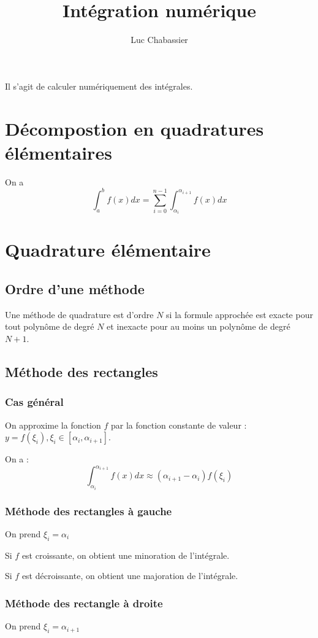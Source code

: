 \documentclass{article}
\title{Intégration numérique}
\author{Luc Chabassier}
\begin{document}
\maketitle

Il s'agit de calculer numériquement des intégrales.

\section{Décompostion en quadratures élémentaires}
On a \[\int_a^b f(x)dx = \sum_{i=0}^{n-1} \int_{\alpha_i}^{\alpha_{i+1}} f(x)dx \]

\section{Quadrature élémentaire}
\subsection{Ordre d'une méthode}
Une méthode de quadrature est d'ordre $N$ si la formule approchée est exacte pour tout polynôme de degré $N$ et inexacte pour au moins un polynôme de degré $N+1$.

\subsection{Méthode des rectangles}
\subsubsection{Cas général}
On approxime la fonction $f$ par la fonction constante de valeur : $y = f(\xi_i), \xi_i \in [\alpha_i, \alpha_{i+1}]$.

On a : \begin{equation}
    \int_{\alpha_i}^{\alpha_{i+1}} f(x)dx \approx (\alpha_{i+1} - \alpha_i)f(\xi_i)
    \label{rect}
\end{equation}

\subsubsection{Méthode des rectangles à gauche}
On prend $\xi_i = \alpha_i$

Si $f$ est croissante, on obtient une minoration de l'intégrale.

Si $f$ est décroissante, on obtient une majoration de l'intégrale.

\subsubsection{Méthode des rectangle à droite}
On prend $\xi_i = \alpha_{i+1}$
\end{document}
